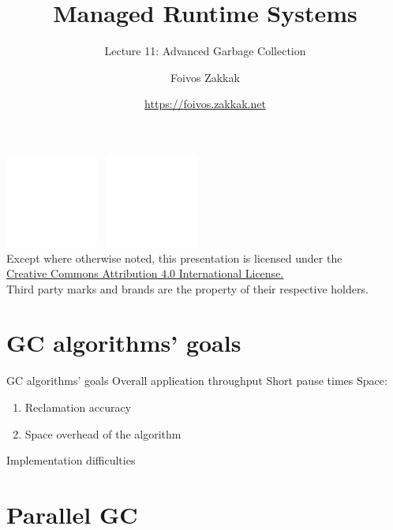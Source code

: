 \documentclass[
14pt,
aspectratio=169,
usenames,
dvipsnames,
x11names]{beamer}
\title{Managed Runtime Systems}
\subtitle{Lecture 11: Advanced Garbage Collection}
\author[\url{https://foivos.zakkak.net}]{Foivos Zakkak}
\date{\url{https://foivos.zakkak.net}}
\begin{document}


\begin{frame}[plain]
  \titlepage
  \centering
  \includegraphics[height=.75cm]{cc}~
  \includegraphics[height=.75cm]{by}\\[1em]
  \scriptsize{Except where otherwise noted, this presentation is licensed under the\\
    \href{http://creativecommons.org/licenses/by/4.0/}%
    {Creative Commons Attribution 4.0 International License.}\\[1ex]
    Third party marks and brands are the property of their respective
    holders.}
\end{frame}


\section{GC algorithms' goals}

\begin{frame}{GC algorithms' goals}
  Overall application throughput
  \vfill
  Short pause times
  \vfill
  Space:
  \begin{enumerate}
  \item Reclamation accuracy
  \item Space overhead of the algorithm
  \end{enumerate}
  \vfill
  Implementation difficulties
\end{frame}

\section{Parallel GC}
\end{document}
